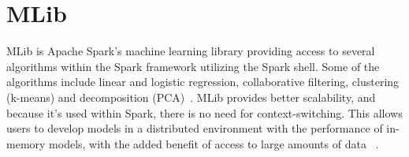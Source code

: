 \section{MLib}

MLib is Apache Spark's machine learning library providing 
access to several algorithms within the Spark framework
utilizing the Spark shell. Some of the algorithms include 
linear and logistic regression, collaborative filtering, 
clustering (k-means) and decomposition (PCA)~\cite{hid-sp18-407-mlib-1}.
MLib provides better scalability, and because it's used within Spark, 
there is no need for context-switching. This allows users to develop
models in a distributed environment with the performance of in-memory 
models, with the added benefit of access to large amounts of data
~\cite{hid-sp18-407-mlib-1}.


